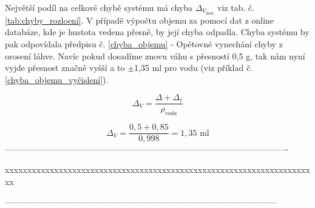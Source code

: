 Největší podíl na celkové chybě systému má chyba $\Delta_{V_{\text{max}}}$ viz tab. č. \ref{tab:chyby_rozloení}. V případě výpočtu objemu za pomocí dat z online databáze, kde je hustota vedena přesně, by její chyba odpadla. Chyba systému by pak odpovídala předpisu č. \ref{chyba_objemu} - Opětovné vynechání chyby z orosení láhve. Navíc pokud dosadíme znovu váhu s přesností 0,5 g, tak nám nyní vyjde přesnost značně vyšší a to $\pm$1,35 ml pro vodu (viz příklad č. \ref{chyba_objemu_vyčislení}).

\begin{equation}
\Delta_V = \frac{\Delta + \Delta_\ell}{\rho_{voda}}
\label{chyba_objemu}
\end{equation}

 \begin{equation}
\Delta_V = \frac{0,5 + 0,85}{0,998} = 1,35 \text{ ml}
\label{chyba_objemu_vyčislení}
\end{equation}
----------------------------------------------------------------------------------------------------

xxxxxxxxxxxxxxxxxxxxxxxxxxxxxxxxxxxxxxxxxxxxxxxxxxxxxxxxxxxxxxxxxxxxxx

------------------------------------------------------------------------------------------------









